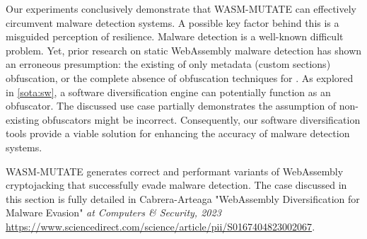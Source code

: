 

\begin{tcolorbox}[title=Reflection,boxrule=1pt,arc=.2em,boxsep=1.0mm]
    Our experiments conclusively demonstrate that WASM-MUTATE can effectively circumvent malware detection systems. 
    A possible key factor behind this is a misguided perception of resilience. 
    Malware detection is a well-known difficult problem. 
    Yet, prior research on static WebAssembly malware detection has shown an erroneous presumption: the existing of only metadata (\Wasm custom sections) obfuscation, or the complete absence of obfuscation techniques for \Wasm \cite{Minesweeper, MinerRay, SEISMIC, RAPID, MINOS}. 
    As explored in \autoref{sota:sw}, a software diversification engine can potentially function as an obfuscator. %
    The discussed use case partially demonstrates the assumption of non-existing obfuscators might be incorrect. 
    Consequently, our software diversification tools provide a viable solution for enhancing the accuracy of \Wasm malware detection systems.

\end{tcolorbox}


\begin{tcolorbox}[title=Contribution paper,boxrule=1pt,arc=.2em,boxsep=1.0mm]
    WASM-MUTATE generates correct and performant variants of WebAssembly cryptojacking that successfully evade malware detection.
    The case discussed in this section is fully detailed in Cabrera-Arteaga \etal "WebAssembly Diversification for Malware Evasion"
    \emph{at Computers \& Security, 2023}
    \url{https://www.sciencedirect.com/science/article/pii/S0167404823002067}. 
\end{tcolorbox}


